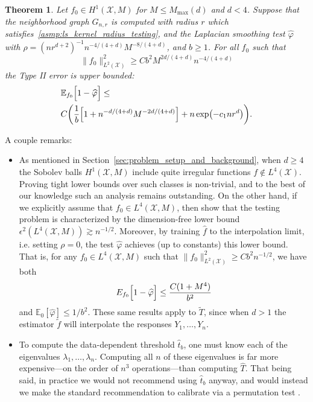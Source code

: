 \documentclass[twoside]{article}
\newcommand{\1}{\mathbf{1}}
\newcommand{\Xset}{\mathcal{X}}
\newcommand{\Leb}{L}
\newcommand{\Ebb}{\mathbb{E}}
\newcommand{\wt}[1]{\widetilde{#1}}
\newcommand{\wh}[1]{\widehat{#1}}
\newtheorem{theorem}{Theorem}
\theoremstyle{definition}
\theoremstyle{remark}
\begin{document}
\begin{theorem}
	\label{thm:laplacian_smoothing_testing}
	Let $f_0 \in H^1(\Xset,M)$ for $M \leq M_{\max}(d)$ and $d < 4$. Suppose that the neighborhood graph $G_{n,r}$ is computed with radius $r$ which satisfies~\ref{asmp:ls_kernel_radius_testing}, and the Laplacian smoothing test $\wh{\varphi}$ with $\rho = (nr^{d + 2})^{-1} n^{-4/(4 + d)} M^{-8/(4 + d)}$, and $b \geq 1$. For all $f_0$ such that
	\begin{equation}
	\label{eqn:laplacian_smoothing_testing}
	\bigl\|f_0\bigr\|_{\Leb^2(\Xset)}^2 \geq C b^2 M^{2d/(4 + d)} n^{-4/(4 + d)}
	\end{equation} 
	the Type II error is upper bounded:
	\begin{align*}
	& \Ebb_{f_0}\Bigl[1 - \wh{\varphi} \Bigr] \leq \\
	& C\biggl(\frac{1}{b}\Bigl[1 + n^{-d/(4 + d)}M^{-2d/(4 + d)}\Bigr] + n\exp\bigl(-c_1nr^d\bigr)\biggr).
	\end{align*}
\end{theorem}
A couple remarks:
\begin{itemize}
	\item As mentioned in Section~\ref{sec:problem_setup_and_background}, when $d \geq 4$ the Sobolev balls $H^1(\Xset,M)$ include quite irregular functions $f \not\in \Leb^4(\Xset)$. Proving tight lower bounds over such classes is non-trivial, and to the best of our knowledge such an analysis remains outstanding. On the other hand, if we explicitly assume that $f_0 \in \Leb^4(\Xset,M)$, then \citet{guerre02} show that the testing problem is characterized by the dimension-free lower bound $\epsilon^{2}(\Leb^4(\Xset,M)) \gtrsim n^{-1/2}$. Moreover, by training $\wh{f}$ to the interpolation limit, i.e. setting $\rho = 0$, the test $\wh{\varphi}$ achieves (up to constants) this lower bound. That is, for any $f_0 \in \Leb^4(\Xset,M)$ such that $\|f_0\|_{\Leb^2(\Xset)}^2 \geq C b^2n^{-1/2}$, we have both
	\begin{equation}
	\label{eqn:laplacian_smoothing_testing_low_smoothness}
	E_{f_0}\Bigl[1 - \wh{\varphi}\Bigr] \leq \frac{C(1 + M^4)}{b^2}
	\end{equation} 
	and $\Ebb_0[\wh{\varphi}] \leq 1/b^2$. These same results apply to $\wt{T}$, since when $d > 1$ the estimator $\wt{f}$ will interpolate the responses $Y_1,\ldots,Y_n$.
	\item To compute the data-dependent threshold $\wh{t}_b$, one must know each of the eigenvalues $\lambda_1,\ldots,\lambda_n$. Computing all $n$ of these eigenvalues is far more expensive---on the order of $n^3$ operations---than computing $\wh{T}$. That being said, in practice we would not recommend using $\wh{t}_b$ anyway, and would instead we make the standard recommendation to calibrate via a permutation test \citep{hoeffding1952}. 
\end{itemize}
\end{document}
